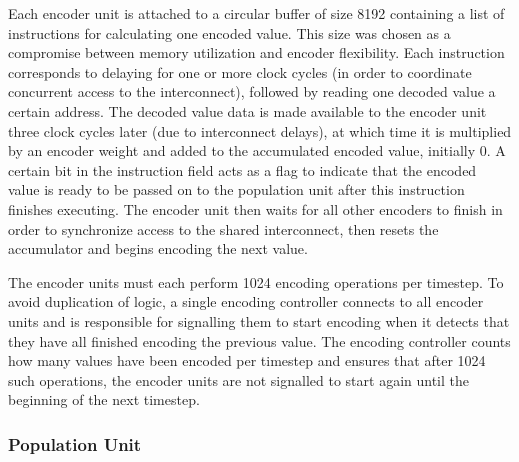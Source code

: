 \documentclass[english]{article}
\begin{document}
Each encoder unit is attached to a circular buffer of size 8192 %
containing a list of instructions for calculating one encoded value. 
This size was chosen as a compromise between memory utilization and encoder flexibility.
Each instruction corresponds to delaying for one or more clock cycles
(in order to coordinate concurrent access to the interconnect),
followed by reading one decoded value a certain address.
The decoded value data is made available to the encoder unit three clock cycles later
(due to interconnect delays), at which time it is multiplied by an encoder weight
and added to the accumulated encoded value, initially 0.
A certain bit in the instruction field acts as a flag to indicate that the encoded value is ready to be passed on to the population unit after this
instruction finishes executing. The encoder unit then waits for all other encoders to finish in order to synchronize
access to the shared interconnect, then resets the accumulator and begins encoding the next value.

The encoder units must each perform 1024 encoding operations per timestep.
To avoid duplication of logic, a single encoding controller connects to all encoder units and is responsible for
signalling them to start encoding when it detects that they have all finished encoding the previous value.
The encoding controller counts how many values have been encoded per timestep and
ensures that after 1024 such operations, the encoder units are not signalled to start again until
the beginning of the next timestep.

\subsubsection{Population Unit}
\end{document}

